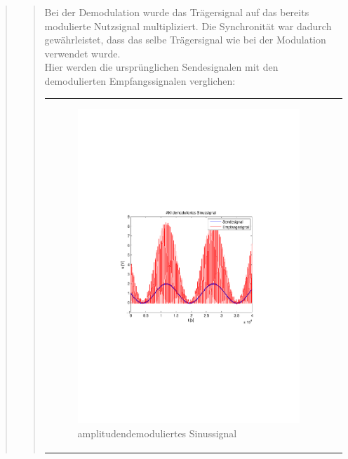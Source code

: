 \begin{quote}
\begin{quote}
        
        Bei der Demodulation wurde das Trägersignal auf das
        bereits modulierte Nutzsignal multipliziert. Die Synchronität war
        dadurch gewährleistet, dass das selbe Trägersignal wie bei der
        Modulation verwendet wurde.\\
        Hier werden die ursprünglichen Sendesignalen mit den
        demodulierten Empfangssignalen verglichen:
        
                \begin{center}
            \begin{tabular}{ll}

            \hspace{-14em}
                \begin{minipage}{0.6\textwidth}

                    \begin{figure}[H]
                        \label{fig:}
                        \includegraphics[scale=0.5, trim = 2cm 6.5cm 1.5cm
                        8.5cm, clip]{./Bilder/synchDemod_sinus} %
                        \caption{amplitudendemoduliertes Sinussignal}
                    \end{figure}


\end{minipage}
\end{tabular}
\end{center}
\end{quote}
\end{quote}
